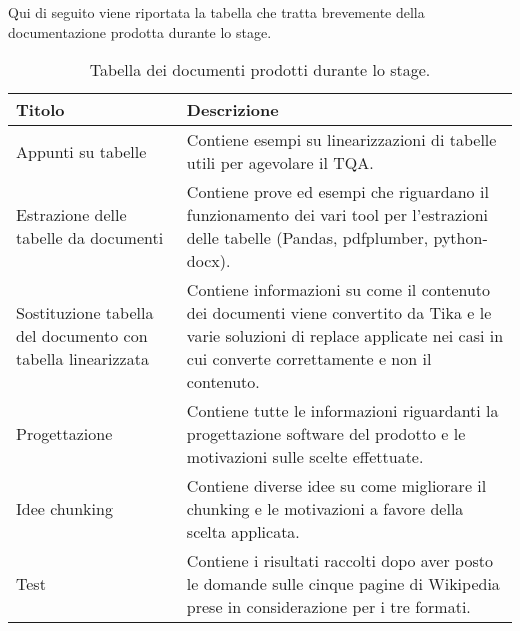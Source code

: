 Qui di seguito viene riportata la tabella che tratta brevemente della documentazione prodotta durante lo stage.
\begin{table}[H]
    \centering
    \begin{tabular}{|p{3cm} |p{8cm} |}
        \hline
        \textbf{Titolo} & \textbf{Descrizione} \\
        \hline
        Appunti su tabelle & Contiene esempi su linearizzazioni di tabelle utili per agevolare il TQA. \\
        \hline
        Estrazione delle tabelle da documenti & Contiene prove ed esempi che riguardano il funzionamento dei vari tool per l'estrazioni delle tabelle (Pandas, pdfplumber, python-docx). \\
        \hline
        Sostituzione tabella del documento con tabella linearizzata & Contiene informazioni su come il contenuto dei documenti viene convertito da Tika e le varie soluzioni di replace applicate nei casi in cui converte correttamente e non il contenuto. \\
        \hline
        Progettazione & Contiene tutte le informazioni riguardanti la progettazione software del prodotto e le motivazioni sulle scelte effettuate. \\
        \hline
        Idee chunking & Contiene diverse idee su come migliorare il chunking e le motivazioni a favore della scelta applicata. \\
        \hline
        Test & Contiene i risultati raccolti dopo aver posto le domande sulle cinque pagine di Wikipedia prese in considerazione per i tre formati. \\
        \hline
    \end{tabular}
    \caption{Tabella dei documenti prodotti durante lo stage.}
\end{table}

